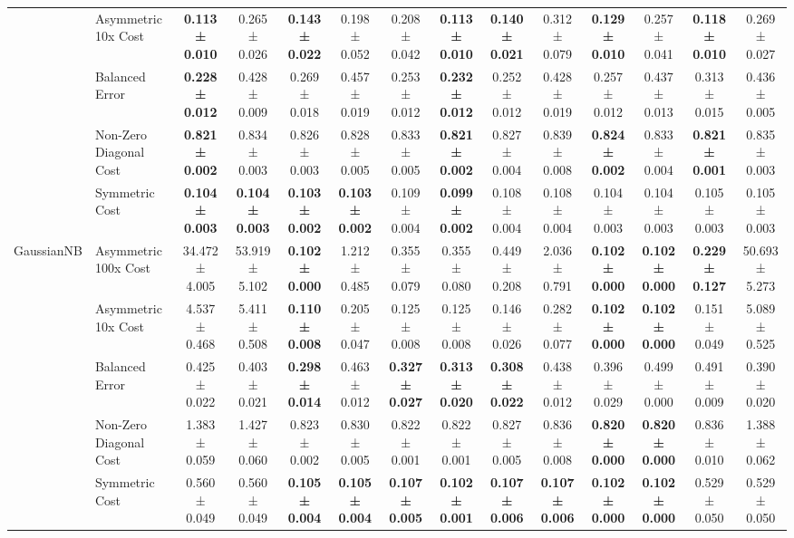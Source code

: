 \begin{table}[H]
{\begin{tabular}{llcccccccccccc}
 & Asymmetric 10x Cost & \textbf{0.113 ± 0.010} & 0.265 ± 0.026 & \textbf{0.143 ± 0.022} & 0.198 ± 0.052 & 0.208 ± 0.042 & \textbf{0.113 ± 0.010} & \textbf{0.140 ± 0.021} & 0.312 ± 0.079 & \textbf{0.129 ± 0.010} & 0.257 ± 0.041 & \textbf{0.118 ± 0.010} & 0.269 ± 0.027 \\
 & Balanced Error & \textbf{0.228 ± 0.012} & 0.428 ± 0.009 & 0.269 ± 0.018 & 0.457 ± 0.019 & 0.253 ± 0.012 & \textbf{0.232 ± 0.012} & 0.252 ± 0.012 & 0.428 ± 0.019 & 0.257 ± 0.012 & 0.437 ± 0.013 & 0.313 ± 0.015 & 0.436 ± 0.005 \\
 & Non-Zero Diagonal Cost & \textbf{0.821 ± 0.002} & 0.834 ± 0.003 & 0.826 ± 0.003 & 0.828 ± 0.005 & 0.833 ± 0.005 & \textbf{0.821 ± 0.002} & 0.827 ± 0.004 & 0.839 ± 0.008 & \textbf{0.824 ± 0.002} & 0.833 ± 0.004 & \textbf{0.821 ± 0.001} & 0.835 ± 0.003 \\
 & Symmetric Cost & \textbf{0.104 ± 0.003} & \textbf{0.104 ± 0.003} & \textbf{0.103 ± 0.002} & \textbf{0.103 ± 0.002} & 0.109 ± 0.004 & \textbf{0.099 ± 0.002} & 0.108 ± 0.004 & 0.108 ± 0.004 & 0.104 ± 0.003 & 0.104 ± 0.003 & 0.105 ± 0.003 & 0.105 ± 0.003 \\
\cline{1-14}
\multirow[t]{5}{*}{GaussianNB} & Asymmetric 100x Cost & 34.472 ± 4.005 & 53.919 ± 5.102 & \textbf{0.102 ± 0.000} & 1.212 ± 0.485 & 0.355 ± 0.079 & 0.355 ± 0.080 & 0.449 ± 0.208 & 2.036 ± 0.791 & \textbf{0.102 ± 0.000} & \textbf{0.102 ± 0.000} & \textbf{0.229 ± 0.127} & 50.693 ± 5.273 \\
 & Asymmetric 10x Cost & 4.537 ± 0.468 & 5.411 ± 0.508 & \textbf{0.110 ± 0.008} & 0.205 ± 0.047 & 0.125 ± 0.008 & 0.125 ± 0.008 & 0.146 ± 0.026 & 0.282 ± 0.077 & \textbf{0.102 ± 0.000} & \textbf{0.102 ± 0.000} & 0.151 ± 0.049 & 5.089 ± 0.525 \\
 & Balanced Error & 0.425 ± 0.022 & 0.403 ± 0.021 & \textbf{0.298 ± 0.014} & 0.463 ± 0.012 & \textbf{0.327 ± 0.027} & \textbf{0.313 ± 0.020} & \textbf{0.308 ± 0.022} & 0.438 ± 0.012 & 0.396 ± 0.029 & 0.499 ± 0.000 & 0.491 ± 0.009 & 0.390 ± 0.020 \\
 & Non-Zero Diagonal Cost & 1.383 ± 0.059 & 1.427 ± 0.060 & 0.823 ± 0.002 & 0.830 ± 0.005 & 0.822 ± 0.001 & 0.822 ± 0.001 & 0.827 ± 0.005 & 0.836 ± 0.008 & \textbf{0.820 ± 0.000} & \textbf{0.820 ± 0.000} & 0.836 ± 0.010 & 1.388 ± 0.062 \\
 & Symmetric Cost & 0.560 ± 0.049 & 0.560 ± 0.049 & \textbf{0.105 ± 0.004} & \textbf{0.105 ± 0.004} & \textbf{0.107 ± 0.005} & \textbf{0.102 ± 0.001} & \textbf{0.107 ± 0.006} & \textbf{0.107 ± 0.006} & \textbf{0.102 ± 0.000} & \textbf{0.102 ± 0.000} & 0.529 ± 0.050 & 0.529 ± 0.050 \\

\end{tabular}}
\end{table}

